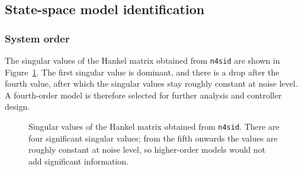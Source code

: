 \documentclass[12pt,a4paper]{article}
\begin{document}
\subsection{State-space model identification}
\subsubsection{System order}
The singular values of the Hankel matrix obtained from \texttt{n4sid} are shown in Figure~\ref{fig:eigenvalues}. The first singular value is dominant, and there is a drop after the fourth value, after which the singular values stay roughly constant at noise level. A fourth-order model is therefore selected for further analysis and controller design.

\begin{figure}[ht!]
    \centering
    
    \caption{Singular values of the Hankel matrix obtained from \texttt{n4sid}. There are four significant singular values; from the fifth onwards the values are roughly constant at noise level, so higher-order models would not add significant information.}
    \label{fig:eigenvalues}
\end{figure}
\end{document}
